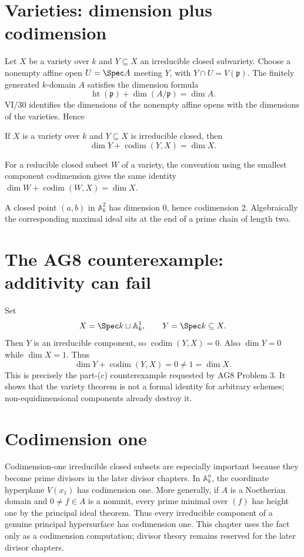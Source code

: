 \section{Varieties: dimension plus codimension}\label{sec:vi31-variety-additivity}
Let $X$ be a variety over $k$ and $Y\subseteq X$ an irreducible closed subvariety. Choose a nonempty affine open
$U=\Spec A$ meeting $Y$, with $Y\cap U=V(\mathfrak p)$.  The finitely generated $k$-domain $A$ satisfies the dimension
formula
\[
 \operatorname{ht}(\mathfrak p)+\dim(A/\mathfrak p)=\dim A.
\]
VI/30 identifies the dimensions of the nonempty affine opens with the dimensions of the varieties. Hence
\begin{theorem}\label{thm:vi31-additivity}
If $X$ is a variety over $k$ and $Y\subseteq X$ is irreducible closed, then
\[
 \boxed{\dim Y+\operatorname{codim}(Y,X)=\dim X.}
\]
\end{theorem}
For a reducible closed subset $W$ of a variety, the convention using the smallest component codimension gives the same
identity $\dim W+\operatorname{codim}(W,X)=\dim X$.


\begin{example}\label{ex:vi31-expand-02}
A closed point $(a,b)$ in $\mathbb A^2_k$ has dimension $0$, hence codimension $2$.  Algebraically the corresponding maximal ideal sits at the end of a prime chain of length two.
\end{example}
\section{The AG8 counterexample: additivity can fail}\label{sec:vi31-ag8-counterexample}
Set
\[
 X=\Spec k\sqcup\mathbb A^1_k,
 \qquad Y=\Spec k\subseteq X.
\]
Then $Y$ is an irreducible component, so $\operatorname{codim}(Y,X)=0$.  Also $\dim Y=0$ while $\dim X=1$. Thus
\[
 \dim Y+\operatorname{codim}(Y,X)=0\neq1=\dim X.
\]
This is precisely the part-(c) counterexample requested by AG8 Problem 3.  It shows that the variety theorem is not a
formal identity for arbitrary schemes; non-equidimensional components already destroy it.


\section{Codimension one}\label{sec:vi31-codim-one}
Codimension-one irreducible closed subsets are especially important because they become prime divisors in the later
divisor chapters.  In $\mathbb A^n_k$, the coordinate hyperplane $V(x_1)$ has codimension one. More generally, if
$A$ is a Noetherian domain and $0\neq f\in A$ is a nonunit, every prime minimal over $(f)$ has height one by the
principal ideal theorem.  Thus every irreducible component of a genuine principal hypersurface has codimension one.
This chapter uses the fact only as a codimension computation; divisor theory remains reserved for the later divisor chapters.


